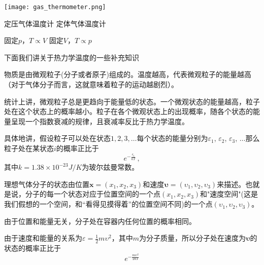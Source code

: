 \documentclass[CJK]{beamer}
\begin{document}
\begin{frame}
\bch

\texttt{[image: gas\_thermometer.png]}


定压气体温度计 \hspace{0.5in} 定体气体温度计

固定$p$，$T\propto V$ \hspace{0.6in}  固定$V$，$T\propto p$

\ech
\end{frame}


\begin{frame}
\bch
下面我们讲关于热力学温度的一些补充知识
\ech
\end{frame}

\begin{frame}
\bch
\bitem
\item{物质是由微观粒子(分子或者原子)组成的。温度越高，代表微观粒子的能量越高（对于气体分子而言，这就意味着粒子的运动越剧烈）。}
\item{统计上讲，微观粒子总是更趋向于能量低的状态。一个微观状态的能量越高，粒子处在这个状态上的概率越小。粒子在各个微观状态上的出现概率，随各个状态的能量呈现一个指数衰减的规律，且衰减率反比于热力学温度。

具体地讲，假设粒子可以处在状态$1,2,3,\ldots$每个状态的能量分别为$\varepsilon_1$, $\varepsilon_2$, $\varepsilon_3$, $\ldots$那么粒子处在某状态$i$的概率正比于
$$e^{-\frac{\epsilon_i}{k T}}\, ,$$其中$k=1.38\times 10^{-23} J/K$为玻尔兹曼常数。
}
\eitem

\ech
\end{frame}

\begin{frame}
\bch
理想气体分子的状态由位置$\mathbf{x} = (x_1, x_2, x_3)$和速度$\mathbf{\upsilon} = (\upsilon_1, \upsilon_2, \upsilon_3)$来描述。也就是说，分子的每一个状态对应于位置空间的一个点$(x_1, x_2, x_3)$和"速度空间"({\darkblue 这是我们假想的一个空间，和“看得见摸得着”的位置空间不同})的一个点$(\upsilon_1, \upsilon_2, \upsilon_3)$。

\skipline

由于位置和能量无关，分子处在容器内任何位置的概率相同。

\skipline

由于速度和能量的关系为$\varepsilon = \frac{1}{2} m \upsilon^2$，其中$m$为分子质量，所以分子处在速度为$\mathbf{\upsilon}$的状态的概率正比于
$$e^{-\frac{m\upsilon^2}{2kT}}$$


\ech
\end{frame}
\end{document}
